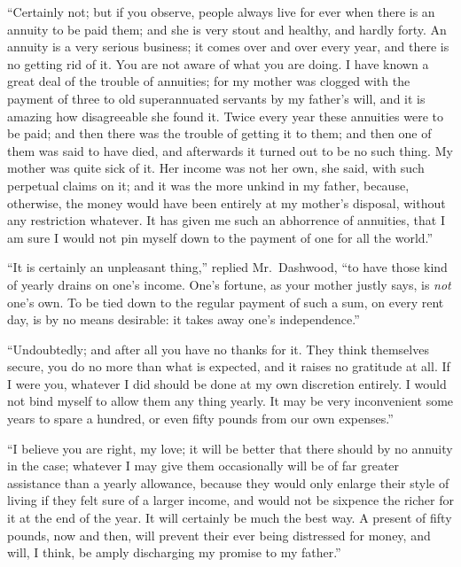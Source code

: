 ``Certainly not; but if you observe, people always
live for ever when there is an annuity to be paid them;
and she is very stout and healthy, and hardly forty.
An annuity is a very serious business; it comes over
and over every year, and there is no getting rid
of it.  You are not aware of what you are doing.
I have known a great deal of the trouble of annuities;
for my mother was clogged with the payment of three
to old superannuated servants by my father's will,
and it is amazing how disagreeable she found it.
Twice every year these annuities were to be paid; and then
there was the trouble of getting it to them; and then one
of them was said to have died, and afterwards it turned
out to be no such thing.  My mother was quite sick of it.
Her income was not her own, she said, with such perpetual
claims on it; and it was the more unkind in my father,
because, otherwise, the money would have been entirely at
my mother's disposal, without any restriction whatever.
It has given me such an abhorrence of annuities, that I am
sure I would not pin myself down to the payment of one for
all the world.''

``It is certainly an unpleasant thing,'' replied Mr.\ Dashwood,
``to have those kind of yearly drains on one's income.
One's fortune, as your mother justly says, is \emph{not} one's own.
To be tied down to the regular payment of such a sum,
on every rent day, is by no means desirable: it takes away
one's independence.''

``Undoubtedly; and after all you have no thanks for it.
They think themselves secure, you do no more than what
is expected, and it raises no gratitude at all.  If I were you,
whatever I did should be done at my own discretion entirely.
I would not bind myself to allow them any thing yearly.
It may be very inconvenient some years to spare a hundred,
or even fifty pounds from our own expenses.''

``I believe you are right, my love; it will be better
that there should by no annuity in the case; whatever I
may give them occasionally will be of far greater assistance
than a yearly allowance, because they would only enlarge
their style of living if they felt sure of a larger income,
and would not be sixpence the richer for it at the end
of the year.  It will certainly be much the best way.
A present of fifty pounds, now and then, will prevent
their ever being distressed for money, and will, I think,
be amply discharging my promise to my father.''

